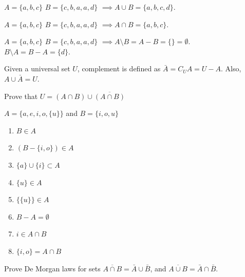 \begin{definition}
  $A = \{a, b, c\}$ $B=\{c, b, a, a, d\}$ $\implies A\cup B = \{a, b, c, d\}$.
\end{definition}

\begin{definition}
  $A = \{a, b, c\}$ $B=\{c, b, a, a, d\}$ $\implies A\cap B = \{a, b, c\}$.
\end{definition}

\begin{definition}
  $A = \{a, b, c\}$ $B=\{c, b, a, a, d\}$ $\implies A\setminus B = A-B = \{\} = \emptyset$.\\
  $B\setminus A = B-A = \{d\}$.\\
\end{definition}

\begin{definition}
  Given a universal set $U$, complement is defined as $\bar{A} = C_U A= U - A$. Also, $A \cup \bar{A} = U$.
\end{definition}


\begin{example}
  Prove that  $U = (A\cap B) \cup \overline{(A\cap B)}$
\end{example}

\begin{example}
  $A=\{a,e,i,o,\{u\}\}$ and $B = \{i, o,  u\}$
  \begin{enumerate}
    \item $B  \in A$
    \item $(B - \{i, o\}) \in  A$
    \item $\{a\} \cup \{i\} \subset A$
    \item $\{u\} \in A$
    \item $\{\{u\}\} \in  A$
    \item $B - A =  \emptyset$
    \item $i \in A \cap B$
    \item $\{i, o\} = A\cap B$
  \end{enumerate}
\end{example}

\begin{example}
  Prove De Morgan laws for sets $\overline{A \cap B} = \bar{A} \cup \bar{B}$, and $\overline{A \cup B} = \bar{A} \cap \bar{B}$.
\end{example}



